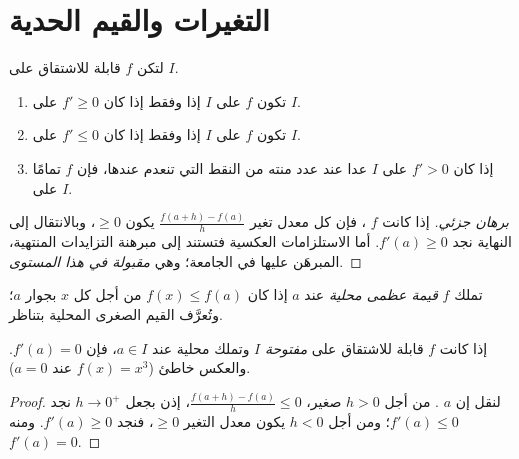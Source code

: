 \section{التغيرات والقيم الحدية}

\begin{theorem}\label{thm:g12:deriv:variations}
لتكن $f$ قابلة للاشتقاق على  $I$.
\begin{enumerate}
  \item تكون $f$  على $I$ إذا وفقط إذا كان $f' \geq 0$ على $I$.
  \item تكون $f$  على $I$ إذا وفقط إذا كان $f' \leq 0$ على $I$.
  \item إذا كان $f' > 0$ على $I$ عدا عند عدد منته من النقط التي
        تنعدم عندها، فإن $f$  تمامًا على $I$.
\end{enumerate}
\end{theorem}

\begin{proof}[برهان جزئي]
إذا كانت $f$ ، فإن كل معدل تغير
$\frac{f(a+h)-f(a)}{h}$ يكون $\geq 0$، وبالانتقال إلى النهاية نجد
$f'(a) \geq 0$. أما الاستلزامات العكسية فتستند إلى مبرهنة التزايدات المنتهية،
المبرهَن عليها في الجامعة؛ وهي \emph{مقبولة في هذا المستوى}.
\end{proof}

\begin{definition}\label{def:g12:deriv:extremum}
تملك $f$ \emph{قيمة عظمى محلية} عند $a$ إذا كان $f(x) \leq f(a)$ من أجل
كل $x$ بجوار $a$؛ وتُعرَّف القيم الصغرى المحلية بتناظر.
\end{definition}

\begin{proposition}\label{prop:g12:deriv:critical}
إذا كانت $f$ قابلة للاشتقاق على  \emph{مفتوحة} $I$ وتملك 
محلية عند $a \in I$، فإن $f'(a) = 0$. والعكس خاطئ
($f(x) = x^3$ عند $a = 0$).
\end{proposition}

\begin{proof}
لنقل إن $a$ . من أجل $h > 0$ صغير،
$\frac{f(a+h)-f(a)}{h} \leq 0$، إذن بجعل $h \to 0^+$ نجد $f'(a) \leq 0$؛
ومن أجل $h < 0$ يكون معدل التغير $\geq 0$، فنجد $f'(a) \geq 0$. ومنه
$f'(a) = 0$.
\end{proof}

